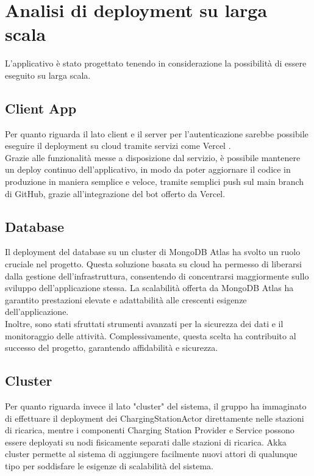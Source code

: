 

\section{Analisi di deployment su larga scala}

L'applicativo è stato progettato tenendo in considerazione la possibilità di essere eseguito su larga scala.\\

\subsection{Client App}
Per quanto riguarda il lato client e il server per l'autenticazione sarebbe possibile eseguire il
deployment su cloud tramite servizi come Vercel \cite{vercel}.\\

Grazie alle funzionalità messe a disposizione dal servizio, è possibile mantenere un deploy
continuo dell'applicativo, in modo da poter aggiornare il codice in produzione in maniera
semplice e veloce, tramite semplici push sul main branch di GitHub, grazie all'integrazione del bot offerto da Vercel.\\

\subsection{Database}
Il deployment del database su un cluster di MongoDB Atlas \cite{atlas} ha svolto un ruolo cruciale nel progetto.
Questa soluzione basata su cloud ha permesso di liberarsi dalla gestione dell'infrastruttura, consentendo
di concentrarsi maggiormente sullo sviluppo dell'applicazione stessa. La scalabilità offerta da MongoDB
Atlas ha garantito prestazioni elevate e adattabilità alle crescenti esigenze dell'applicazione.\\

Inoltre, sono stati sfruttati strumenti avanzati per la sicurezza dei dati e il monitoraggio delle attività.
Complessivamente, questa scelta ha contribuito al successo del progetto, garantendo affidabilità e sicurezza.\\

\subsection{Cluster}
Per quanto riguarda invece il lato "cluster" del sistema, il gruppo ha immaginato di effettuare
il deployment dei ChargingStationActor direttamente nelle stazioni di ricarica, mentre i
componenti Charging Station Provider e Service possono essere deployati su nodi fisicamente
separati dalle stazioni di ricarica. Akka cluster permette al sistema di aggiungere facilmente
nuovi attori di qualunque tipo per soddisfare le esigenze di scalabilità del sistema.\\

